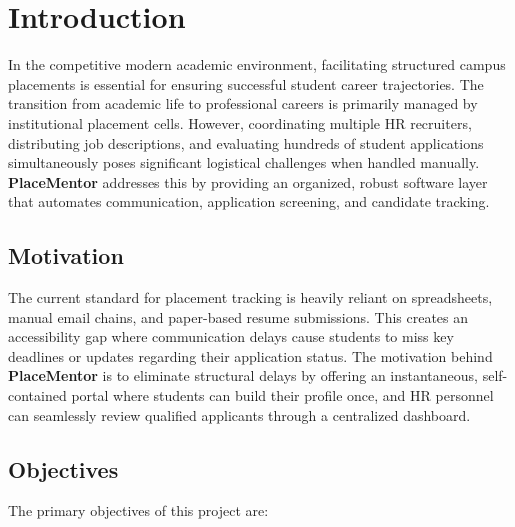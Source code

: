 \documentclass[a4paper,12pt]{report}
\begin{document}
\newpage
{}
\pagestyle{fancy}
\fancyhf{}
\fancyfoot[C]{\small\thepage}
\renewcommand{\headrulewidth}{0.4pt}
\renewcommand{\footrulewidth}{0.4pt}

\chapter{Introduction}

In the competitive modern academic environment, facilitating structured campus placements is essential for ensuring successful student career trajectories. The transition from academic life to professional careers is primarily managed by institutional placement cells. However, coordinating multiple HR recruiters, distributing job descriptions, and evaluating hundreds of student applications simultaneously poses significant logistical challenges when handled manually. \textbf{PlaceMentor} addresses this by providing an organized, robust software layer that automates communication, application screening, and candidate tracking.

\section{Motivation}

The current standard for placement tracking is heavily reliant on spreadsheets, manual email chains, and paper-based resume submissions. This creates an accessibility gap where communication delays cause students to miss key deadlines or updates regarding their application status. The motivation behind \textbf{PlaceMentor} is to eliminate structural delays by offering an instantaneous, self-contained portal where students can build their profile once, and HR personnel can seamlessly review qualified applicants through a centralized dashboard. 

\section{Objectives}

The primary objectives of this project are:
\end{document}
